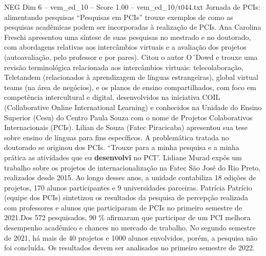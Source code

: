 \begin{textsample}{NEG Dim 6 – vem\_ed\_10 – Score 1.00 – vem\_ed\_10/t044.txt}  \label{ex:f6_neg_126}
Jornada de PCIs: alimentando pesquisas “Pesquisas em PCIs” trouxe exemplos de como as pesquisas acadêmicas podem ser incorporadas à realização de PCIs.
Ana Carolina Freschi apresentou uma síntese de suas pesquisas no mestrado e no doutorado, com abordagens relativas aos intercâmbios virtuais e a avaliação dos projetos (autoavaliação, pelo professor e por pares).
Citou o autor O´Dowd e trouxe uma revisão terminológica relacionada aos intercâmbios virtuais: telecolaboração, Teletandem (relacionados à aprendizagem de línguas estrangeiras), global virtual teams (na área de negócios), e os planos de ensino compartilhados, com foco em competência intercultural e digital, desenvolvidos na iniciativa COIL (Collaborative Online International Learning) e conhecidos na Unidade do Ensino Superior (Cesu) do Centro Paula Souza com o nome de Projetos Colaborativos Internacionais (PCIs).
Lilian de Souza (Fatec Piracicaba) apresentou sua tese sobre ensino de línguas para fins específicos.
A problemática tratada no doutorado se originou dos PCIs. “Trouxe para a minha pesquisa e a minha prática as atividades que eu \textbf{desenvolvi} no PCI”.
Lidiane Murad expôs um trabalho sobre os projetos de internacionalização na Fatec São José do Rio Preto, realizados desde 2015.
Ao longo desses anos, a unidade contabiliza 18 edições de projetos, 170 alunos participantes e 9 universidades parceiras.
Patrícia Patrício (equipe dos PCIs) sintetizou os resultados da pesquisa de percepção realizada com professores e alunos que participaram de PCIs no primeiro semestre de 2021.Dos 572 pesquisados, 90 \% afirmaram que participar de um PCI melhora desempenho acadêmico e chances no mercado de trabalho.
No segundo semestre de 2021, há mais de 40 projetos e 1000 alunos envolvidos, porém, a pesquisa não foi concluída.
Os resultados devem ser analisados no primeiro semestre de 2022.

\end{textsample}
